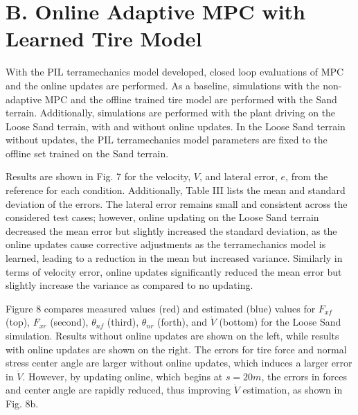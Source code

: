 \documentclass[10pt]{article}
\begin{document}
\section*{B. Online Adaptive MPC with Learned Tire Model}
With the PIL terramechanics model developed, closed loop evaluations of MPC and the online updates are performed. As a baseline, simulations with the non-adaptive MPC and the offline trained tire model are performed with the Sand terrain. Additionally, simulations are performed with the plant driving on the Loose Sand terrain, with and without online updates. In the Loose Sand terrain without updates, the PIL terramechanics model parameters are fixed to the offline set trained on the Sand terrain.

Results are shown in Fig. 7 for the velocity, $V$, and lateral error, $e$, from the reference for each condition. Additionally, Table III lists the mean and standard deviation of the errors. The lateral error remains small and consistent across the considered test cases; however, online updating on the Loose Sand terrain decreased the mean error but slightly increased the standard deviation, as the online updates cause corrective adjustments as the terramechanics model is learned, leading to a reduction in the mean but increased variance. Similarly in terms of velocity error, online updates significantly reduced the mean error but slightly increase the variance as compared to no updating.

Figure 8 compares measured values (red) and estimated (blue) values for $F_{x f}$ (top), $F_{x r}$ (second), $\theta_{n f}$ (third), $\theta_{n r}$ (forth), and $\dot{V}$ (bottom) for the Loose Sand simulation. Results without online updates are shown on the left, while results with online updates are shown on the right. The errors for tire force and normal stress center angle are larger without online updates, which induces a larger error in $\dot{V}$. However, by updating online, which begins at $s=20 m$, the errors in forces and center angle are rapidly reduced, thus improving $\dot{V}$ estimation, as shown in Fig. 8b.
\end{document}
